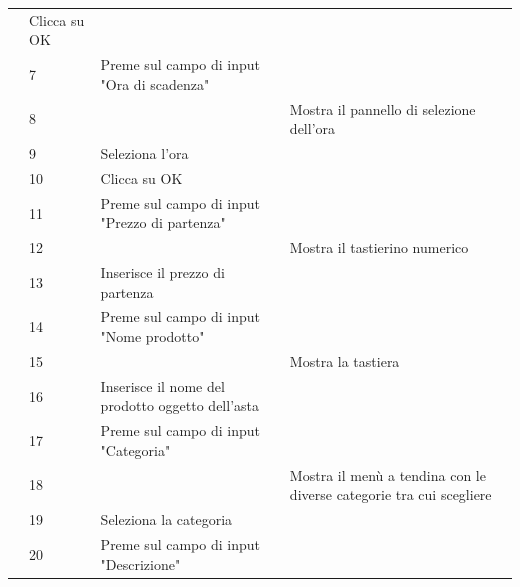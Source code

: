 \begin{longtable}{|C{3.0cm}|C{1.3cm}|L{5.2cm}|L{5.2cm}|}
                        & Clicca su OK
                        & \\
                        & 7
                        & Preme sul campo di input "Ora di scadenza"
                        & \\
                        & 8
                        & 
                        & Mostra il pannello di selezione dell'ora\\
                        & 9
                        & Seleziona l'ora
                        & \\
                        & 10
                        & Clicca su OK
                        & \\
                        & 11
                        & Preme sul campo di input "Prezzo di partenza"
                        & \\
                        & 12
                        &
                        & Mostra il tastierino numerico \\
                        & 13
                        & Inserisce il prezzo di partenza
                        & \\
                        & 14
                        & Preme sul campo di input "Nome prodotto"
                        & \\
                        & 15
                        &
                        & Mostra la tastiera \\
                        & 16
                        & Inserisce il nome del prodotto oggetto dell'asta
                        & \\
                        & 17
                        & Preme sul campo di input "Categoria"
                        & \\
                        & 18
                        &
                        & Mostra il menù a tendina con le diverse categorie tra cui scegliere \\
                        & 19
                        & Seleziona la categoria
                        & \\
                        & 20
                        & Preme sul campo di input "Descrizione"

\end{longtable}
